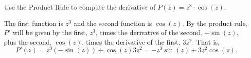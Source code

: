 \begin{example} \label{Ex:2.5.Eg3}
Use the Product Rule to compute the derivative of $P(z) = z^3 \cdot \cos(z)$. 

\solution The first function is $z^3$ and the second function is $\cos(z)$.  By the product rule, $P'$ will be given by the first, $z^3$, times the derivative of the second, $-\sin(z)$, plus the second, $\cos(z)$, times the derivative of the first,  $3z^2$.  That is,
\[ P'(z) = z^3(-\sin(z)) + \cos(z) 3z^2 = -z^3 \sin(z) + 3z^2 \cos(z).\]
\end{example}